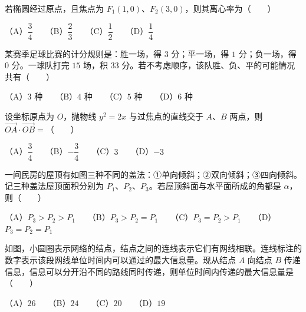 \begin{question}
若椭圆经过原点，且焦点为 $F_1(1,0)$、$F_2(3,0)$，则其离心率为\mbox{（　　）}

（A）$\dfrac34$　　（B）$\dfrac23$　　（C）$\dfrac12$　　（D）$\dfrac14$

\end{question}
\begin{question}
某赛季足球比赛的计分规则是：胜一场，得 $3$ 分；平一场，得 $1$ 分；负一场，得 $0$ 分。一球队打完 $15$ 场，积 $33$ 分。若不考虑顺序，该队胜、负、平的可能情况共有\mbox{（　　）}

（A）$3$ 种　　（B）$4$ 种　　（C）$5$ 种　　（D）$6$ 种

\end{question}
\begin{question}
设坐标原点为 $O$，抛物线 $y^2=2x$ 与过焦点的直线交于 $A$、$B$ 两点，则 $\overrightarrow{OA}\cdot\overrightarrow{OB}=$\mbox{（　　）}

（A）$\dfrac34$　　（B）$-\dfrac34$　　（C）$3$　　（D）$-3$

\Needspace{0.4\textheight}
\end{question}
\begin{question}
一间民房的屋顶有如图三种不同的盖法：①单向倾斜；②双向倾斜；③四向倾斜。记三种盖法屋顶面积分别为 $P_1$、$P_2$、$P_3$。若屋顶斜面与水平面所成的角都是 $\alpha$，则\mbox{（　　）}
\nopagebreak[4]
\begin{center}\end{center}
\nopagebreak[4]
（A）$P_3>P_2>P_1$　　（B）$P_3>P_2=P_1$　　（C）$P_3=P_2>P_1$　　（D）$P_3=P_2=P_1$

\Needspace{0.4\textheight}
\end{question}
\begin{question}
如图，小圆圈表示网络的结点，结点之间的连线表示它们有网线相联。连线标注的数字表示该段网线单位时间内可以通过的最大信息量。现从结点 $A$ 向结点 $B$ 传递信息，信息可以分开沿不同的路线同时传递，则单位时间内传递的最大信息量是\mbox{（　　）}
\nopagebreak[4]
\begin{center}\end{center}
\nopagebreak[4]
（A）$26$　　（B）$24$　　（C）$20$　　（D）$19$

\end{question}

